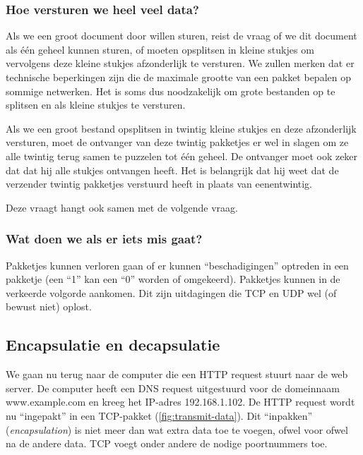 \subsubsection{Hoe versturen we heel veel data?}
Als we een groot document door willen sturen, reist de vraag of we dit document als één geheel kunnen sturen, of moeten opsplitsen in kleine stukjes om vervolgens deze kleine stukjes afzonderlijk te versturen.
We zullen merken dat er technische beperkingen zijn die de maximale grootte van een pakket bepalen op sommige netwerken.
Het is soms dus noodzakelijk om grote bestanden op te splitsen en als kleine stukjes te versturen.

Als we een groot bestand opsplitsen in twintig kleine stukjes en deze afzonderlijk versturen, moet de ontvanger van deze twintig pakketjes er wel in slagen om ze alle twintig terug samen te puzzelen tot één geheel.
De ontvanger moet ook zeker dat dat hij alle stukjes ontvangen heeft.
Het is belangrijk dat hij weet dat de verzender twintig pakketjes verstuurd heeft in plaats van eenentwintig.

Deze vraagt hangt ook samen met de volgende vraag.

\subsubsection{Wat doen we als er iets mis gaat?}
Pakketjes kunnen verloren gaan of er kunnen ``beschadigingen'' optreden in een pakketje (een ``1'' kan een ``0'' worden of omgekeerd).
Pakketjes kunnen in de verkeerde volgorde aankomen.
Dit zijn uitdagingen die TCP en UDP wel (of bewust niet) oplost.




\subsection{Encapsulatie en decapsulatie}

We gaan nu terug naar de computer die een HTTP request stuurt naar de web server.
De computer heeft een DNS request uitgestuurd voor de domeinnaam www.example.com en kreeg het IP-adres 192.168.1.102.
De HTTP request wordt nu ``ingepakt'' in een TCP-pakket (\vref{fig:transmit-data}).
Dit ``inpakken'' (\emph{encapsulation}) is niet meer dan wat extra data toe te voegen, ofwel voor ofwel na de andere data.
TCP voegt onder andere de nodige poortnummers toe.


